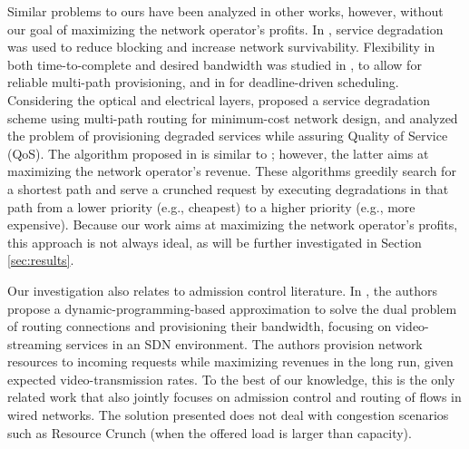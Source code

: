 \documentclass[journal]{IEEEtran}
\begin{document}
Similar problems to ours have been analyzed in other works, however, without our goal of maximizing the network operator's profits. In \cite{savas2016backup}, service degradation was used to reduce blocking and increase network survivability. Flexibility in both time-to-complete and desired bandwidth was studied in \cite{zhang2010reliable}, to allow for reliable multi-path provisioning, and in \cite{andrei2010provisioning} for deadline-driven scheduling. Considering the optical and electrical layers, \cite{gkamas2015joint} proposed a service degradation scheme using multi-path routing for minimum-cost network design, and \cite{7842043} analyzed the problem of provisioning degraded services while assuring Quality of Service (QoS). The algorithm proposed in \cite{7842043} is similar to \cite{roy2014network}; however, the latter aims at maximizing the network operator's revenue. These algorithms greedily search for a shortest path and serve a crunched request by executing degradations in that path from a lower priority (e.g., cheapest) to a higher priority (e.g., more expensive). Because our work aims at maximizing the network operator's profits, this approach is not always ideal, as will be further investigated in Section \ref{sec:results}. %

Our investigation also relates to admission control literature. In \cite{7744684}, the authors propose a dynamic-programming-based approximation to solve the dual problem of routing connections and provisioning their bandwidth, focusing on video-streaming services in an SDN environment. The authors provision network resources to incoming requests while maximizing revenues in the long run, given expected video-transmission rates. To the best of our knowledge, this is the only related work that also jointly focuses on admission control and routing of flows in wired networks. The solution presented does not deal with congestion scenarios such as Resource Crunch (when the offered load is larger than capacity). %
\end{document}
